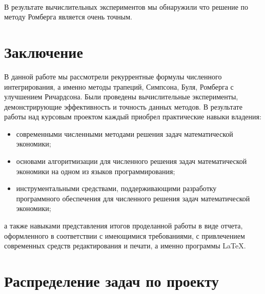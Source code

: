 \documentclass[14pt, titlepage, a4paper]{extarticle} %
\begin{document}
	~\\
	В результате вычислительных экспериментов мы обнаружили что решение по методу Ромберга является очень точным.
	
	\pagebreak
	
	\section*{Заключение}
	
	В данной работе мы рассмотрели рекуррентные формулы численного интегрирования, а именно методы трапеций, Симпсона, Буля, Ромберга с улучшением Ричардсона. Были проведены вычислительные эксперименты, демонстрирующие эффективность и точность данных методов.
	В результате работы над курсовым проектом каждый приобрел практические навыки владения:
	\begin{itemize}
		\item современными численными методами решения задач математической экономики;
		\item основами алгоритмизации для численного решения задач математической экономики на одном из языков программирования;
		\item инструментальными средствами, поддерживающими разработку программного обеспечения для численного решения задач математической экономики; 
	\end{itemize}
	а также навыками представления итогов проделанной работы в виде отчета, оформленного в соответствии с имеющимися требованиями, с привлечением современных средств редактирования и печати, а именно программы LaTeX.
	
	\pagebreak


	\section*{Распределение задач по проекту}
	
\end{document}
